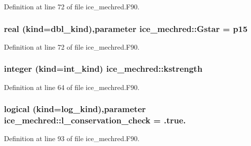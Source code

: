 Definition at line 72 of file ice\_\-mechred.F90.\hypertarget{namespaceice__mechred_a85e0edec0423e8de65aaa8ddfa61d02e}{
\subsubsection[{Gstar}]{\setlength{\rightskip}{0pt plus 5cm}real (kind=dbl\_\-kind),parameter {\bf ice\_\-mechred::Gstar} = p15}}
\label{namespaceice__mechred_a85e0edec0423e8de65aaa8ddfa61d02e}


Definition at line 72 of file ice\_\-mechred.F90.\hypertarget{namespaceice__mechred_a2272185e4ee38f92dbb9908fca1dac0a}{
\subsubsection[{kstrength}]{\setlength{\rightskip}{0pt plus 5cm}integer (kind=int\_\-kind) {\bf ice\_\-mechred::kstrength}}}
\label{namespaceice__mechred_a2272185e4ee38f92dbb9908fca1dac0a}


Definition at line 64 of file ice\_\-mechred.F90.\hypertarget{namespaceice__mechred_a28f8598357ef3851a6288dfdd581732d}{
\subsubsection[{l\_\-conservation\_\-check}]{\setlength{\rightskip}{0pt plus 5cm}logical (kind=log\_\-kind),parameter {\bf ice\_\-mechred::l\_\-conservation\_\-check} = .true.}}
\label{namespaceice__mechred_a28f8598357ef3851a6288dfdd581732d}


Definition at line 93 of file ice\_\-mechred.F90.